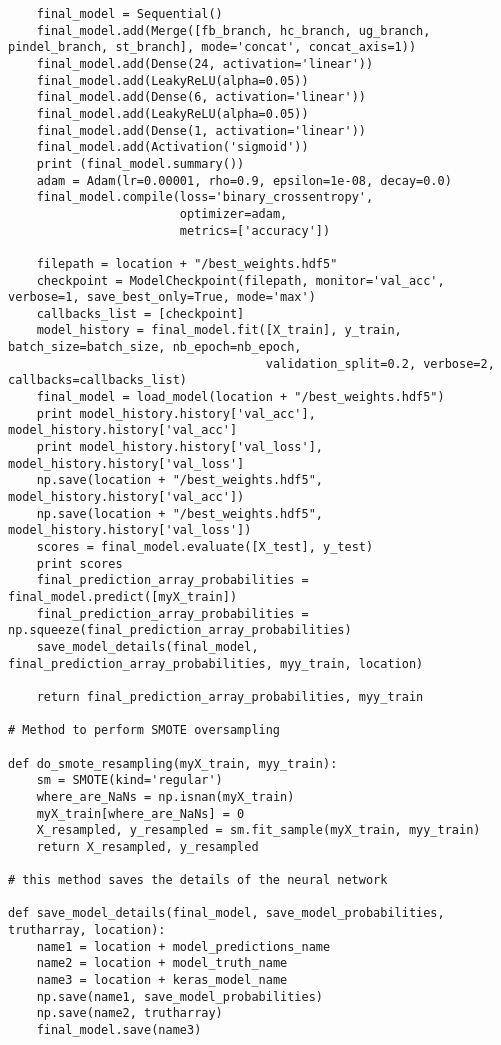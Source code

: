 \documentclass{article}
\begin{document}
\begin{verbatim}
    final_model = Sequential()
    final_model.add(Merge([fb_branch, hc_branch, ug_branch, pindel_branch, st_branch], mode='concat', concat_axis=1))
    final_model.add(Dense(24, activation='linear'))
    final_model.add(LeakyReLU(alpha=0.05))
    final_model.add(Dense(6, activation='linear'))
    final_model.add(LeakyReLU(alpha=0.05))
    final_model.add(Dense(1, activation='linear'))
    final_model.add(Activation('sigmoid'))
    print (final_model.summary())
    adam = Adam(lr=0.00001, rho=0.9, epsilon=1e-08, decay=0.0)
    final_model.compile(loss='binary_crossentropy',
                        optimizer=adam,
                        metrics=['accuracy'])

    filepath = location + "/best_weights.hdf5"
    checkpoint = ModelCheckpoint(filepath, monitor='val_acc', verbose=1, save_best_only=True, mode='max')
    callbacks_list = [checkpoint]
    model_history = final_model.fit([X_train], y_train, batch_size=batch_size, nb_epoch=nb_epoch,
                                    validation_split=0.2, verbose=2, callbacks=callbacks_list)
    final_model = load_model(location + "/best_weights.hdf5")
    print model_history.history['val_acc'], model_history.history['val_acc']
    print model_history.history['val_loss'], model_history.history['val_loss']
    np.save(location + "/best_weights.hdf5", model_history.history['val_acc'])
    np.save(location + "/best_weights.hdf5", model_history.history['val_loss'])
    scores = final_model.evaluate([X_test], y_test)
    print scores
    final_prediction_array_probabilities = final_model.predict([myX_train])
    final_prediction_array_probabilities = np.squeeze(final_prediction_array_probabilities)
    save_model_details(final_model, final_prediction_array_probabilities, myy_train, location)

    return final_prediction_array_probabilities, myy_train

# Method to perform SMOTE oversampling

def do_smote_resampling(myX_train, myy_train):
    sm = SMOTE(kind='regular')
    where_are_NaNs = np.isnan(myX_train)
    myX_train[where_are_NaNs] = 0
    X_resampled, y_resampled = sm.fit_sample(myX_train, myy_train)
    return X_resampled, y_resampled

# this method saves the details of the neural network

def save_model_details(final_model, save_model_probabilities, trutharray, location):
    name1 = location + model_predictions_name
    name2 = location + model_truth_name
    name3 = location + keras_model_name
    np.save(name1, save_model_probabilities)
    np.save(name2, trutharray)
    final_model.save(name3)


\end{verbatim}
\end{document}
